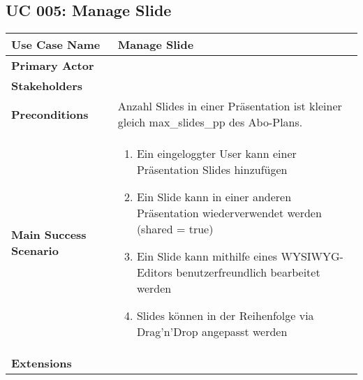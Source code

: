 \subsection{UC 005: Manage Slide}
\label{uc:005-manage-slide}

\begin{tabular}{|l|p{}|}
\hline
\textbf{Use Case Name} 	&	Manage Slide	\\ \hline
\textbf{Primary Actor} 	&		\\ \hline
\textbf{Stakeholders}	&		\\ \hline
\textbf{Preconditions}	&	Anzahl Slides in einer Präsentation ist kleiner gleich max_slides_pp des Abo-Plans.	\\ \hline
\textbf{Main Success Scenario}	&
\begin{enumerate}
	\item Ein eingeloggter User kann einer Präsentation Slides hinzufügen
	\item Ein Slide kann in einer anderen Präsentation wiederverwendet werden (shared = true)
	\item Ein Slide kann mithilfe eines WYSIWYG-Editors benutzerfreundlich bearbeitet werden
	\item Slides können in der Reihenfolge via Drag'n'Drop angepasst werden
\end{enumerate}
\\ \hline
\textbf{Extensions}	& 	\\ \hline
\end{tabular}